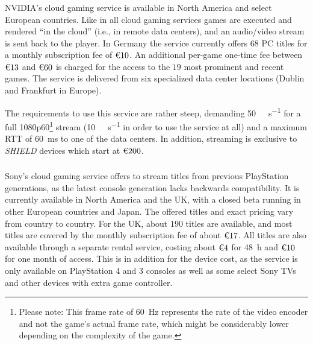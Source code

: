 


\subsubsection{\gfnow}

NVIDIA's cloud gaming service%
is available in North America and select European countries. Like in all cloud gaming services  games are executed and rendered ``in the cloud'' (i.e., in remote data centers), and an audio/video stream is sent back to the player. In Germany the service currently offers $68$ PC titles for a monthly subscription fee of $\text{\texteuro} 10$. An additional per-game one-time fee between $\text{\texteuro} 13$ and $\text{\texteuro} 60$ is charged for the access to the $19$ most prominent and recent games. The service is delivered from six specialized data center locations (Dublin and Frankfurt in Europe).

The requirements to use this service are rather steep, demanding \SI{50}{\mega\bit\per\second} for a full 1080p60\footnote{\label{foot:rate}Please note: This frame rate of \SI{60}{\hertz} represents the rate of the video encoder and not the game's actual frame rate, which might be considerably lower depending on the complexity of the game.} stream (\SI{10}{\mega\bit\per\second} in order to use the service at all) and a maximum \acrshort{RTT} of \SI{60}{\milli\second} to one of the data centers. In addition, streaming is exclusive to \textit{SHIELD} devices which start at $\text{\texteuro} 200$.


\subsubsection{\psnow}

Sony's cloud gaming service offers to stream titles from previous PlayStation generations, as the latest console generation lacks backwards compatibility. It is currently available in North America and the UK, with a closed beta running in other European countries and Japan. The offered titles and exact pricing vary from country to country. For the UK, about $190$ titles are available, and most titles are covered by the monthly subscription fee of about $\text{\texteuro} 17$. All titles are also available through a separate rental service, costing about $\text{\texteuro} 4$ for \SI{48}{\hour} and $\text{\texteuro} 10$ for one month of access. This is in addition for the device cost, as the service is only available on PlayStation 4 and 3 consoles as well as some select Sony TVs and other devices with extra game controller.

